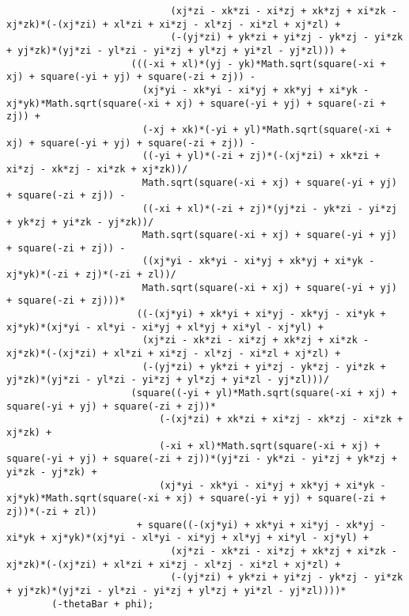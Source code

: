 \begin{lstlisting}
							 (xj*zi - xk*zi - xi*zj + xk*zj + xi*zk - xj*zk)*(-(xj*zi) + xl*zi + xi*zj - xl*zj - xi*zl + xj*zl) + 
							 (-(yj*zi) + yk*zi + yi*zj - yk*zj - yi*zk + yj*zk)*(yj*zi - yl*zi - yi*zj + yl*zj + yi*zl - yj*zl))) + 
					  (((-xi + xl)*(yj - yk)*Math.sqrt(square(-xi + xj) + square(-yi + yj) + square(-zi + zj)) - 
						(xj*yi - xk*yi - xi*yj + xk*yj + xi*yk - xj*yk)*Math.sqrt(square(-xi + xj) + square(-yi + yj) + square(-zi + zj)) + 
						(-xj + xk)*(-yi + yl)*Math.sqrt(square(-xi + xj) + square(-yi + yj) + square(-zi + zj)) - 
						((-yi + yl)*(-zi + zj)*(-(xj*zi) + xk*zi + xi*zj - xk*zj - xi*zk + xj*zk))/
						Math.sqrt(square(-xi + xj) + square(-yi + yj) + square(-zi + zj)) - 
						((-xi + xl)*(-zi + zj)*(yj*zi - yk*zi - yi*zj + yk*zj + yi*zk - yj*zk))/
						Math.sqrt(square(-xi + xj) + square(-yi + yj) + square(-zi + zj)) - 
						((xj*yi - xk*yi - xi*yj + xk*yj + xi*yk - xj*yk)*(-zi + zj)*(-zi + zl))/
						Math.sqrt(square(-xi + xj) + square(-yi + yj) + square(-zi + zj)))*
					   ((-(xj*yi) + xk*yi + xi*yj - xk*yj - xi*yk + xj*yk)*(xj*yi - xl*yi - xi*yj + xl*yj + xi*yl - xj*yl) + 
						(xj*zi - xk*zi - xi*zj + xk*zj + xi*zk - xj*zk)*(-(xj*zi) + xl*zi + xi*zj - xl*zj - xi*zl + xj*zl) + 
						(-(yj*zi) + yk*zi + yi*zj - yk*zj - yi*zk + yj*zk)*(yj*zi - yl*zi - yi*zj + yl*zj + yi*zl - yj*zl)))/
					  (square((-yi + yl)*Math.sqrt(square(-xi + xj) + square(-yi + yj) + square(-zi + zj))*
						   (-(xj*zi) + xk*zi + xi*zj - xk*zj - xi*zk + xj*zk) + 
						   (-xi + xl)*Math.sqrt(square(-xi + xj) + square(-yi + yj) + square(-zi + zj))*(yj*zi - yk*zi - yi*zj + yk*zj + yi*zk - yj*zk) + 
						   (xj*yi - xk*yi - xi*yj + xk*yj + xi*yk - xj*yk)*Math.sqrt(square(-xi + xj) + square(-yi + yj) + square(-zi + zj))*(-zi + zl))
					   + square((-(xj*yi) + xk*yi + xi*yj - xk*yj - xi*yk + xj*yk)*(xj*yi - xl*yi - xi*yj + xl*yj + xi*yl - xj*yl) + 
							 (xj*zi - xk*zi - xi*zj + xk*zj + xi*zk - xj*zk)*(-(xj*zi) + xl*zi + xi*zj - xl*zj - xi*zl + xj*zl) + 
							 (-(yj*zi) + yk*zi + yi*zj - yk*zj - yi*zk + yj*zk)*(yj*zi - yl*zi - yi*zj + yl*zj + yi*zl - yj*zl))))*
		(-thetaBar + phi);
		

\end{lstlisting}
